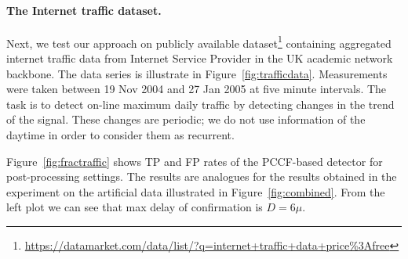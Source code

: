 \paragraph{The Internet traffic dataset.}
Next, we test our approach on publicly available dataset\footnote{\url{https://datamarket.com/data/list/?q=internet+traffic+data+price\%3Afree}} containing aggregated internet traffic data from Internet Service Provider in the UK academic network backbone. The data series is illustrate in Figure~\ref{fig:trafficdata}.
Measurements were taken between 19 Nov 2004 and 27 Jan 2005  at five minute intervals.
The task is to detect on-line maximum daily traffic by detecting changes in the trend of the signal.
These changes are periodic;  we do not use information of the daytime in order to consider them as recurrent.

Figure~\ref{fig:fractraffic} shows TP and FP rates of the PCCF-based detector for post-processing settings. The results are analogues for the results obtained in the experiment on the artificial data illustrated in Figure~\ref{fig:combined}. From the left plot we can see that max delay of confirmation is $D=6\mu$.

